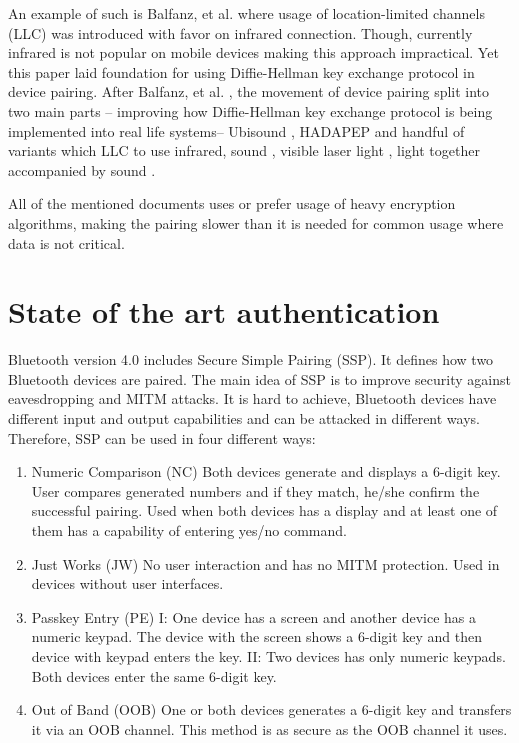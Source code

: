 \documentclass[12pt]{article}
\begin{document}
An example of such is Balfanz, et al. \cite {talkingto} where usage of location-limited channels (LLC) was introduced with favor on infrared connection. Though, currently infrared is not popular on mobile devices  making this approach impractical. Yet this paper laid foundation for using Diffie-Hellman key exchange protocol in device pairing. After Balfanz, et al. \cite {talkingto}, the movement of device pairing split into two main parts – improving how Diffie-Hellman key exchange protocol is being implemented into real life systems– Ubisound \cite {ubisound}, HADAPEP \cite {hadapep} and handful of variants which LLC to use infrared, sound \cite {talkingto}, visible laser light \cite {laserlight}, light together accompanied by sound \cite {beeplight}.

All of the mentioned documents uses or prefer usage of heavy encryption algorithms, making the pairing slower than it is needed for common usage where data is not critical.

\newpage

\section{State of the art authentication}
\label{sec:State of the art authentication}

Bluetooth version 4.0 includes Secure Simple Pairing (SSP). It defines how two Bluetooth devices are paired. The main idea of SSP is to improve security against eavesdropping and MITM attacks. It is hard to achieve, Bluetooth devices have different input and output capabilities and can be attacked in different ways. Therefore, SSP can be used in four different ways:
\begin{enumerate}
	\item Numeric Comparison (NC)
	Both devices generate and displays a 6-digit key. User compares generated numbers and if they match, he/she confirm the successful pairing. Used when both devices has a display and at least one of them has a capability of entering yes/no command.
	\item Just Works (JW)
	No user interaction and has no MITM protection. Used in devices without user interfaces.

	\item Passkey Entry (PE)
    I: One device has a screen and another device has a numeric keypad. The device with the screen shows a 6-digit key and then device with keypad enters the key.
	II: Two devices has only numeric keypads. Both devices enter the same 6-digit key.

	\item Out of Band (OOB)
    One or both devices generates a 6-digit key and transfers it via an OOB channel. This method is as secure as the OOB channel it uses.
\end{enumerate}
\end{document}
